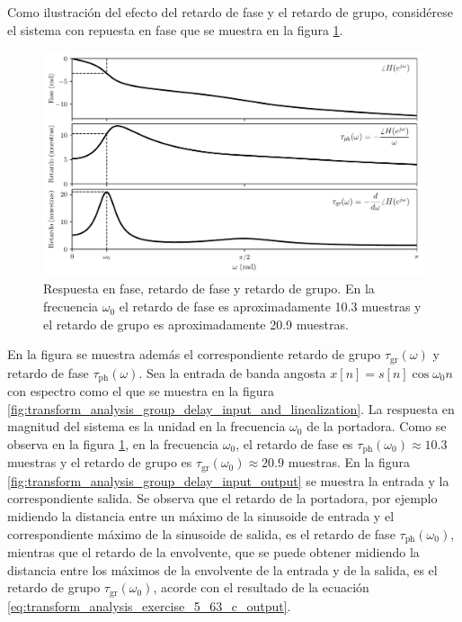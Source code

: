 \documentclass[a4paper]{report}
\begin{document}
\begin{enumerate}
Como ilustración del efecto del retardo de fase y el retardo de grupo, considérese el sistema con repuesta en fase que se muestra en la figura \ref{fig:transform_analysis_group_delay_phase_and_group_delay}. 
\begin{figure}[!htb]
 \begin{center}
 \includegraphics[width=\textwidth]{figuras/transform_analysis_group_delay_phase_and_group_delay.pdf}
 \caption{\label{fig:transform_analysis_group_delay_phase_and_group_delay} Respuesta en fase, retardo de fase y retardo de grupo. En la frecuencia \(\omega_0\) el retardo de fase es aproximadamente 10.3 muestras y el retardo de grupo es aproximadamente 20.9 muestras.}
 \end{center}
\end{figure}
En la figura se muestra además el correspondiente retardo de grupo \(\tau_\textrm{gr}(\omega)\) y retardo de fase \(\tau_\textrm{ph}(\omega)\). Sea la entrada de banda angosta \(x[n]=s[n]\cos\omega_0n\) con espectro como el que se muestra en la figura \ref{fig:transform_analysis_group_delay_input_and_linealization}. La respuesta en magnitud del sistema es la unidad en la frecuencia \(\omega_0\) de la portadora. Como se observa en la figura \ref{fig:transform_analysis_group_delay_phase_and_group_delay}, en la frecuencia \(\omega_0\), el retardo de fase es \(\tau_\textrm{ph}(\omega_0)\approx10.3\) muestras y el retardo de grupo es \(\tau_\textrm{gr}(\omega_0)\approx20.9\) muestras. En la figura \ref{fig:transform_analysis_group_delay_input_output} se muestra la entrada y la correspondiente salida. Se observa que el retardo de la portadora, por ejemplo midiendo la distancia entre un máximo de la sinusoide de entrada y el correspondiente máximo de la sinusoide de salida, es el retardo de fase \(\tau_\textrm{ph}(\omega_0)\), mientras que el retardo de la envolvente, que se puede obtener midiendo la distancia entre los máximos de la envolvente de la entrada y de la salida, es el retardo de grupo \(\tau_\textrm{gr}(\omega_0)\), acorde con el resultado de la ecuación \ref{eq:transform_analysis_exercise_5_63_c_output}. 

\end{enumerate}
\end{document}
